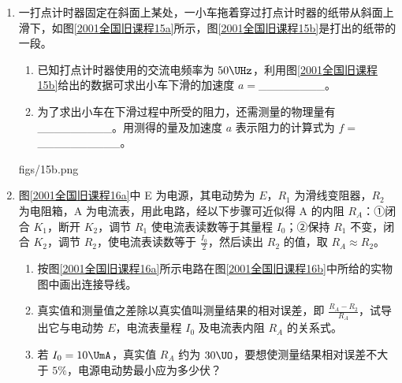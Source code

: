 \documentclass[\gkver]{gaokaozhenti}
\begin{document}
\begin{enumerate}
\item
一打点计时器固定在斜面上某处，一小车拖着穿过打点计时器的纸带从斜面上滑下，如图\ref{2001全国旧课程15a}所示，图\ref{2001全国旧课程15b}是打出的纸带的一段。

\begin{enumerate}
	\item
	已知打点计时器使用的交流电频率为 $50\UHz$，利用图\ref{2001全国旧课程15b}给出的数据可求出小车下滑的加速度 $a = $\_\_\_\_\_\_\_\_。
	\item
	为了求出小车在下滑过程中所受的阻力，还需测量的物理量有\_\_\_\_\_\_\_\_\_。用测得的量及加速度 $a$ 表示阻力的计算式为 $f = $\_\_\_\_\_\_\_\_\_\_。
\end{enumerate}

{figs/15b.png}


\item
图\ref{2001全国旧课程16a}中 E 为电源，其电动势为 $E$，$R_{1}$ 为滑线变阻器，$R_{2}$ 为电阻箱，A 为电流表，用此电路，经以下步骤可近似得 A 的内阻 $R_{A}$：①闭合 $K_{1}$，断开 $K_{2}$，调节 $R_{1}$ 使电流表读数等于其量程 $I_{0}$；②保持 $R_{1}$ 不变，闭合 $K_{2}$，调节 $R_{2}$，使电流表读数等于 $\frac{I_{0}}{2}$，然后读出 $R_{2}$ 的值，取 $R_{A}\approx R_{2}$。

\begin{enumerate}
	\item
	按图\ref{2001全国旧课程16a}所示电路在图\ref{2001全国旧课程16b}中所给的实物图中画出连接导线。
	\item
	真实值和测量值之差除以真实值叫测量结果的相对误差，即 $\frac{R_{A}-R_{2}}{R_{A}}$，试导出它与电动势 $E$，电流表量程 $I_{0}$ 及电流表内阻 $R_{A}$ 的关系式。
	\item
	若 $I_{0}=10\UmA$，真实值 $R_{A}$ 约为 $30\UO$，要想使测量结果相对误差不大于 $5\%$，电源电动势最小应为多少伏？
\end{enumerate}


\end{enumerate}
\end{document}

